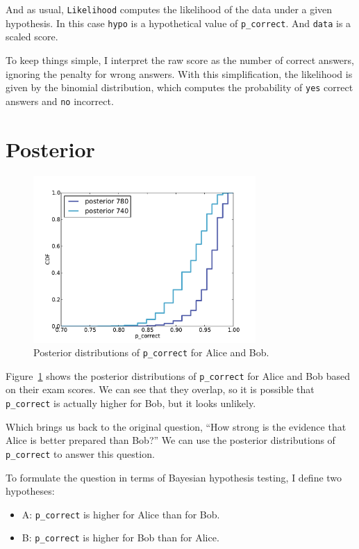 \documentclass[12pt]{book}
\begin{document}
And as usual, {\tt Likelihood} computes the likelihood of the data
under a given hypothesis.  In this case {\tt hypo} is a hypothetical
value of \verb"p_correct".  And {\tt data} is a scaled score.

To keep things simple, I interpret the raw score as the number of
correct answers, ignoring the penalty for wrong answers.  With
this simplification, the likelihood is given by the binomial
distribution, which computes the probability of {\tt yes} correct
answers and {\tt no} incorrect.


\section{Posterior}

\begin{figure}
\centerline{\includegraphics[height=2.5in]{figs/sat_posteriors_p_corr.pdf}}
\caption{Posterior distributions of {\tt p\_correct} for Alice and Bob.}
\label{fig.satposterior1}
\end{figure}

Figure~\ref{fig.satposterior1} shows the posterior distributions
of \verb"p_correct" for Alice and Bob based on their exam scores.
We can see that they overlap, so it is possible that \verb"p_correct"
is actually higher for Bob, but it looks unlikely.

Which brings us back to the original question, ``How strong is the
evidence that Alice is better prepared than Bob?''  We can use the
posterior distributions of \verb"p_correct" to answer this question.

To formulate the question in terms of Bayesian hypothesis testing,
I define two hypotheses:

\begin{itemize}

\item A: \verb"p_correct" is higher for Alice than for Bob.

\item B: \verb"p_correct" is higher for Bob than for Alice.

\end{itemize}
\end{document}
